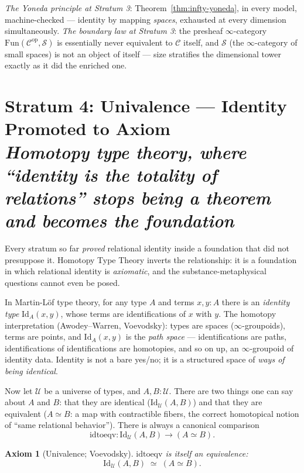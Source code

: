 \documentclass[11pt]{article}
\theoremstyle{plain}
\newtheorem{axiom}[theorem]{Axiom}
\theoremstyle{definition}
\theoremstyle{remark}
\newcommand{\C}{\mathcal{C}}
\newcommand{\op}{\mathrm{op}}
\newcommand{\U}{\mathcal{U}}
\newcommand{\stratum}[2]{\section{#1 \\ {\normalsize\normalfont\itshape #2}}}
\begin{document}
\begin{refrain}
\emph{The Yoneda principle at Stratum 3}: Theorem~\ref{thm:infty-yoneda}, in every model, machine-checked --- identity by mapping \emph{spaces}, exhausted at every dimension simultaneously. \emph{The boundary law at Stratum 3}: the presheaf $\infty$-category $\mathrm{Fun}(\C^{\op}, \mathcal{S})$ is essentially never equivalent to $\C$ itself, and $\mathcal{S}$ (the $\infty$-category of small spaces) is not an object of itself --- size stratifies the dimensional tower exactly as it did the enriched one.
\end{refrain}

\stratum{Stratum 4: Univalence --- Identity Promoted to Axiom}{Homotopy type theory, where ``identity is the totality of relations'' stops being a theorem and becomes the foundation}

Every stratum so far \emph{proved} relational identity inside a foundation that did not presuppose it. Homotopy Type Theory inverts the relationship: it is a foundation in which relational identity is \emph{axiomatic}, and the substance-metaphysical questions cannot even be posed.

In Martin-L\"of type theory, for any type $A$ and terms $x, y : A$ there is an \emph{identity type} $\mathrm{Id}_A(x,y)$, whose terms are identifications of $x$ with $y$. The homotopy interpretation (Awodey--Warren, Voevodsky): types are spaces ($\infty$-groupoids), terms are points, and $\mathrm{Id}_A(x,y)$ is the \emph{path space} --- identifications are paths, identifications of identifications are homotopies, and so on up, an $\infty$-groupoid of identity data. Identity is not a bare yes/no; it is a structured space of \emph{ways of being identical}.

Now let $\U$ be a universe of types, and $A, B : \U$. There are two things one can say about $A$ and $B$: that they are identical ($\mathrm{Id}_\U(A,B)$) and that they are equivalent ($A \simeq B$: a map with contractible fibers, the correct homotopical notion of ``same relational behavior''). There is always a canonical comparison
\[
\mathrm{idtoeqv}\colon \mathrm{Id}_\U(A,B) \longrightarrow (A \simeq B).
\]

\begin{axiom}[Univalence; Voevodsky]\label{ax:ua}
$\mathrm{idtoeqv}$ is itself an equivalence:
\[
\mathrm{Id}_\U(A,B) \;\simeq\; (A \simeq B).
\]
\end{axiom}
\end{document}
